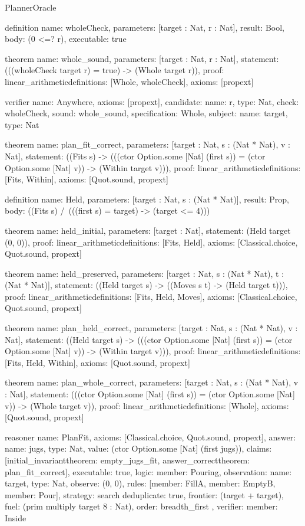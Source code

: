 \begin{lexlean}{PlannerOracle}
\begin{semanticmodule}
definition{
  name: wholeCheck,
  parameters: [target : Nat, r : Nat],
  result: Bool,
  body: (0 <=? r),
  executable: true
}

theorem{
  name: whole_sound,
  parameters: [target : Nat, r : Nat],
  statement: (((wholeCheck target r) = true) -> (Whole target r)),
  proof: linear_arithmetic{definitions: [Whole, wholeCheck]},
  axioms: [propext]
}

verifier{
  name: Anywhere,
  axioms: [propext],
  candidate: {name: r, type: Nat},
  check: wholeCheck,
  sound: whole_sound,
  specification: Whole,
  subject: {name: target, type: Nat}
}

theorem{
  name: plan_fit_correct,
  parameters: [target : Nat, s : (Nat * Nat), v : Nat],
  statement: ((Fits s) -> (((ctor Option.some [Nat] (first s)) = (ctor Option.some [Nat] v)) -> (Within target v))),
  proof: linear_arithmetic{definitions: [Fits, Within]},
  axioms: [Quot.sound, propext]
}

definition{
  name: Held,
  parameters: [target : Nat, s : (Nat * Nat)],
  result: Prop,
  body: ((Fits s) /\ (((first s) = target) -> (target <= 4)))
}

theorem{
  name: held_initial,
  parameters: [target : Nat],
  statement: (Held target (0, 0)),
  proof: linear_arithmetic{definitions: [Fits, Held]},
  axioms: [Classical.choice, Quot.sound, propext]
}

theorem{
  name: held_preserved,
  parameters: [target : Nat, s : (Nat * Nat), t : (Nat * Nat)],
  statement: ((Held target s) -> ((Moves s t) -> (Held target t))),
  proof: linear_arithmetic{definitions: [Fits, Held, Moves]},
  axioms: [Classical.choice, Quot.sound, propext]
}

theorem{
  name: plan_held_correct,
  parameters: [target : Nat, s : (Nat * Nat), v : Nat],
  statement: ((Held target s) -> (((ctor Option.some [Nat] (first s)) = (ctor Option.some [Nat] v)) -> (Within target v))),
  proof: linear_arithmetic{definitions: [Fits, Held, Within]},
  axioms: [Quot.sound, propext]
}

theorem{
  name: plan_whole_correct,
  parameters: [target : Nat, s : (Nat * Nat), v : Nat],
  statement: (((ctor Option.some [Nat] (first s)) = (ctor Option.some [Nat] v)) -> (Whole target v)),
  proof: linear_arithmetic{definitions: [Whole]},
  axioms: [Quot.sound, propext]
}

reasoner{
  name: PlanFit,
  axioms: [Classical.choice, Quot.sound, propext],
  answer: {name: jugs, type: Nat, value: (ctor Option.some [Nat] (first jugs))},
  claims: [initial_invariant{theorem: empty_jugs_fit}, answer_correct{theorem: plan_fit_correct}],
  executable: true,
  logic: {member: Pouring},
  observation: {name: target, type: Nat},
  observe: (0, 0),
  rules: [{member: FillA}, {member: EmptyB}, {member: Pour}],
  strategy: search{
    deduplicate: true,
    frontier: (target + target),
    fuel: (prim multiply target 8 : Nat),
    order: breadth_first
  },
  verifier: {member: Inside}
}


\end{semanticmodule}
\end{lexlean}
